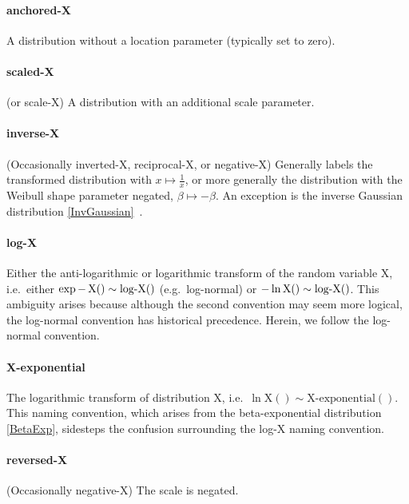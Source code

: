 \paragraph*{anchored-X}  A distribution without a location parameter (typically set to zero).

\paragraph*{scaled-X} (or scale-X) A distribution with an additional scale parameter. 

\paragraph*{inverse-X} (Occasionally inverted-X, reciprocal-X, or negative-X) Generally labels the transformed distribution with $x\mapsto\tfrac{1}{x}$, or more generally the distribution with the Weibull shape parameter negated, $\beta\mapsto-\beta$. An exception is the inverse Gaussian distribution \eqref{InvGaussian}~\cite{Johnson1994}. 

\paragraph*{log-X}   Either the anti-logarithmic or logarithmic transform of the random variable X, i.e.\ either  $\exp - \operatorname{X}() \sim \operatorname{log-X}()$ (e.g.\ log-normal)  or $-\ln \text{X}() \sim \operatorname{log-X}()$.  This ambiguity arises because although the second convention may seem more logical, the log-normal convention has historical precedence. Herein, we follow the log-normal convention. 
\label{log-transform-name}

\paragraph*{X-exponential}  The logarithmic transform of distribution X, i.e.\ $\ln \text{X}() \sim \text{X-exponential}()$. This naming convention, which arises from the beta-exponential distribution \eqref{BetaExp}, sidesteps the confusion surrounding the log-X naming convention.


\paragraph*{reversed-X} (Occasionally negative-X)  The scale is negated. 
